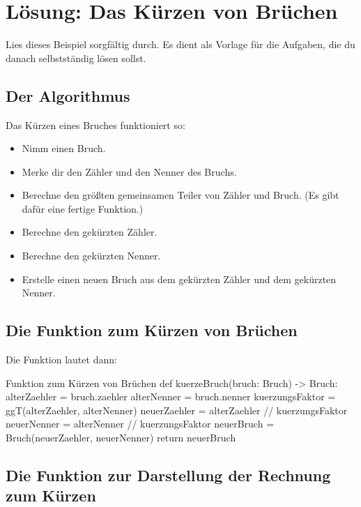 \section{Lösung: Das Kürzen von Brüchen}

Lies dieses Beispiel sorgfältig durch. Es dient als Vorlage für die Aufgaben, die du danach selbstständig lösen sollst.

\subsection{Der Algorithmus}

Das Kürzen eines Bruches funktioniert so:
\begin{itemize}
	\item Nimm einen Bruch.
	\item Merke dir den Zähler und den Nenner des Bruchs.
	\item Berechne den größten gemeinsamen Teiler von Zähler und Bruch. (Es gibt dafür eine fertige Funktion.)
	\item Berechne den gekürzten Zähler.
	\item Berechne den gekürzten Nenner.
	\item Erstelle einen neuen Bruch aus dem gekürzten Zähler und dem gekürzten Nenner.
\end{itemize}

\subsection{Die Funktion zum Kürzen von Brüchen}

Die Funktion lautet dann:

\begin{codePython}{Funktion zum Kürzen von Brüchen}
def kuerzeBruch(bruch: Bruch) -> Bruch:
	alterZaehler = bruch.zaehler
	alterNenner = bruch.nenner
	kuerzungsFaktor = ggT(alterZaehler, alterNenner)
	neuerZaehler = alterZaehler // kuerzungsFaktor
	neuerNenner = alterNenner // kuerzungsFaktor
	neuerBruch = Bruch(neuerZaehler, neuerNenner)
	return neuerBruch
\end{codePython}

\subsection{Die Funktion zur Darstellung der Rechnung zum Kürzen}

